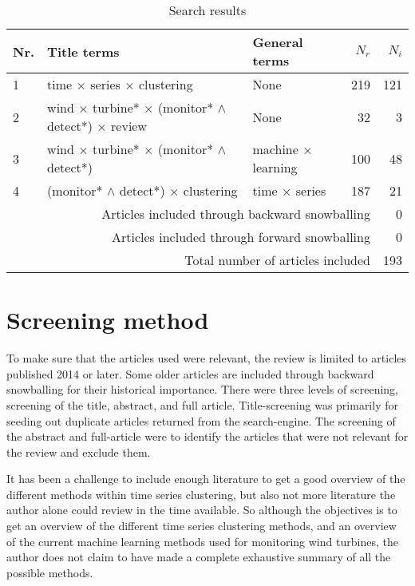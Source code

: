 \begin{table*}[h]
    \centering
    \begin{tabular}{ lllrr } 
        \toprule
        Nr. & Title terms & General terms & $N_r$ & $N_i$ \\
        \midrule
        1 & time $\times$ series $\times$ clustering & None & 219 & 121 \\ 
        2 & wind $\times$ turbine* $\times$ (monitor* $\wedge{}$ detect*) $\times$ review & None & 32 & 3 \\
        3 & wind $\times$ turbine* $\times$ (monitor* $\wedge{}$ detect*) & machine $\times$ learning & 100 & 48 \\ 
        4 & (monitor* $\wedge{}$ detect*) $\times$ clustering & time $\times$ series & 187 & 21 \\
        \midrule
        \multicolumn{4}{r}{Articles included through backward snowballing} & 0 \\
        \multicolumn{4}{r}{Articles included through forward snowballing} & 0 \\
        \multicolumn{4}{r}{Total number of articles included} & 193 \\
        \bottomrule
    \end{tabular}
    \caption{Search results}
    \label{tab:search_results}
\end{table*}

\section{Screening method}
To make sure that the articles used were relevant, the review is limited to articles published 2014 or later. Some older articles are included through backward snowballing for their historical importance. There were three levels of screening, screening of the title, abstract, and full article. Title-screening was primarily for seeding out duplicate articles returned from the search-engine. The screening of the abstract and full-article were to identify the articles that were not relevant for the review and exclude them. \bigskip

It has been a challenge to include enough literature to get a good overview of the different methods within time series clustering, but also not more literature the author alone could review in the time available. So although the objectives is to get an overview of the different time series clustering methods, and an overview of the current machine learning methods used for monitoring wind turbines, the author does not claim to have made a complete exhaustive summary of all the possible methods. \bigskip

